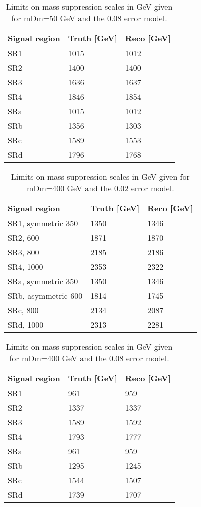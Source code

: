 \begin{table}[ht]
\begin{center}
\begin{tabular}{|l|l|l|}
\hline
Signal region & Truth [GeV]& Reco [GeV]\\ \hline
SR1&1015&1012\\
SR2&1400&1400\\
SR3&1636&1637\\
SR4&1846&1854\\ \hline
SRa&1015&1012\\
SRb&1356&1303\\
SRc&1589&1553\\
SRd&1796&1768\\ \hline
\end{tabular}
\caption{Limits on mass suppression scales in GeV given for mDm=50 GeV and the 0.08 error model.}
\label{tab:masssupp010}
\end{center}
\end{table}

\begin{table}[ht!]
\begin{center}
\begin{tabular}{|l|l|l|}
\hline
Signal region & Truth [GeV]& Reco [GeV]\\ \hline
SR1, symmetric 350&1350&1346\\
SR2, 600&1871&1870\\
SR3, 800&2185&2186\\
SR4, 1000&2353&2322\\ \hline
SRa, symmetric 350&1350&1346\\
SRb, asymmetric 600&1814&1745\\
SRc, 800&2134&2087\\
SRd, 1000&2313&2281\\ \hline
\end{tabular}
\caption{Limits on mass suppression scales in GeV given for mDm=400 GeV and the 0.02 error model.}
\label{tab:masssupp2002}
\end{center}
\end{table}

\begin{table}[ht]
\begin{center}
\begin{tabular}{|l|l|l|}
\hline
Signal region & Truth [GeV]& Reco [GeV]\\ \hline
SR1&961&959\\
SR2&1337&1337\\
SR3&1589&1592\\
SR4&1793&1777\\ \hline

SRa&961&959\\
SRb&1295&1245\\
SRc&1544&1507\\
SRd&1739&1707\\ \hline
\end{tabular}
\caption{Limits on mass suppression scales in GeV given for mDm=400 GeV and the 0.08 error model.}
\label{tab:masssupp2010}
\end{center}
\end{table}

